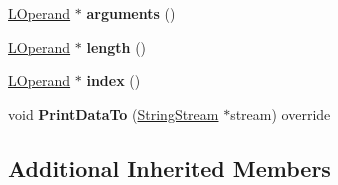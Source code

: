 \begin{DoxyCompactItemize}
\item 
\hyperlink{classv8_1_1internal_1_1_l_operand}{L\+Operand} $\ast$ {\bfseries arguments} ()\hypertarget{classv8_1_1internal_1_1_l_access_arguments_at_a54eb42639fc35df69b3a3f57d7042ffd}{}\label{classv8_1_1internal_1_1_l_access_arguments_at_a54eb42639fc35df69b3a3f57d7042ffd}

\item 
\hyperlink{classv8_1_1internal_1_1_l_operand}{L\+Operand} $\ast$ {\bfseries length} ()\hypertarget{classv8_1_1internal_1_1_l_access_arguments_at_aca767dd582bd23265453d015e4cb3174}{}\label{classv8_1_1internal_1_1_l_access_arguments_at_aca767dd582bd23265453d015e4cb3174}

\item 
\hyperlink{classv8_1_1internal_1_1_l_operand}{L\+Operand} $\ast$ {\bfseries index} ()\hypertarget{classv8_1_1internal_1_1_l_access_arguments_at_a6d772ab178a18a50a3fa64dee0cab4c7}{}\label{classv8_1_1internal_1_1_l_access_arguments_at_a6d772ab178a18a50a3fa64dee0cab4c7}

\item 
void {\bfseries Print\+Data\+To} (\hyperlink{classv8_1_1internal_1_1_string_stream}{String\+Stream} $\ast$stream) override\hypertarget{classv8_1_1internal_1_1_l_access_arguments_at_a3027cb02e655a31d8f9264d10b49c7be}{}\label{classv8_1_1internal_1_1_l_access_arguments_at_a3027cb02e655a31d8f9264d10b49c7be}

\end{DoxyCompactItemize}
\subsection*{Additional Inherited Members}


